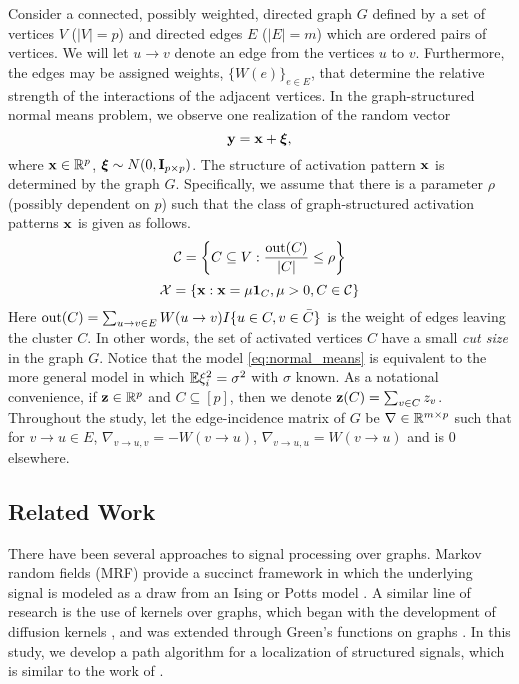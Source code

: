 Consider a connected, possibly weighted, directed graph $G$ defined by a set of vertices $V$ ($|V| = p$) and directed edges $E$ ($|E| = m$) which are ordered pairs of vertices.
We will let $u \to v$ denote an edge from the vertices $u$ to $v$.
Furthermore, the edges may be assigned weights, $\{ W(e) \}_{e \in E}$, that determine the relative strength of the interactions of the adjacent vertices.
In the graph-structured normal means problem, we observe one realization of the random vector
\begin{equation}
\label{eq:normal_means}
\yb = \xb + \xib,
\end{equation}
where $\mathbf{x} \in \mathbb{R}^p$, $\bm{\xi} \sim N(0,\mathbf{I}_{p\times p})$.
The structure of activation pattern $\mathbf{x}$ is determined by the graph $G$. 
Specifically, we assume that there is a parameter $\rho$ (possibly
dependent on $p$) such that the class of graph-structured activation patterns $\mathbf{x}$ is given as follows.
\[
\mathcal{C} = \left\{ C \subseteq V : \frac{\textrm{out}(C)}{|C|} \le \rho \right\}
\]
\[
\mathcal{X} = \left\{\mathbf{x} : \mathbf{x} = \mu {\bf 1}_C, \mu > 0, C \in \mathcal{C}\right\}
\]
Here $\textrm{out}(C) = \sum_{u \to v\in E} W(u \to v) I\{ u \in C, v \in \bar C \}$ is the weight of edges leaving the cluster $C$.
In other words, the set of activated vertices $C$ have a small {\em cut size} in the graph $G$.
Notice that the model \eqref{eq:normal_means} is equivalent to the more general model in which $\mathbb{E} \xi_i^2 = \sigma^2$ with $\sigma$ known.
As a notational convenience, if $\mathbf{z} \in \mathbb{R}^p$ and $C \subseteq [p]$, then we denote $\mathbf{z}(C) = \sum_{v \in C} z_v$.
Throughout the study, let the edge-incidence matrix of $G$ be $\nabla \in \mathbb{R}^{m \times p}$ such that for $v \to u \in E$, $\nabla_{v\to u,v} = -W(v \to u)$, $\nabla_{v \to u,u} = W(v \to u)$ and is $0$ elsewhere.


\subsection{Related Work}

There have been several approaches to signal processing over graphs.
Markov random fields (MRF) provide a succinct framework in which the underlying signal is modeled as a draw from an Ising or Potts model \cite{cevher2009sparse,ravikumar2006quadratic}.
A similar line of research is the use of kernels over graphs, which began with the development of diffusion kernels \cite{kondor2002diffusion}, and was extended through Green's functions on graphs \cite{smola2003kernels}.
In this study, we develop a path algorithm for a localization of structured signals, which is similar to the work of \cite{tibshirani2011solution,hoefling2010path}.

